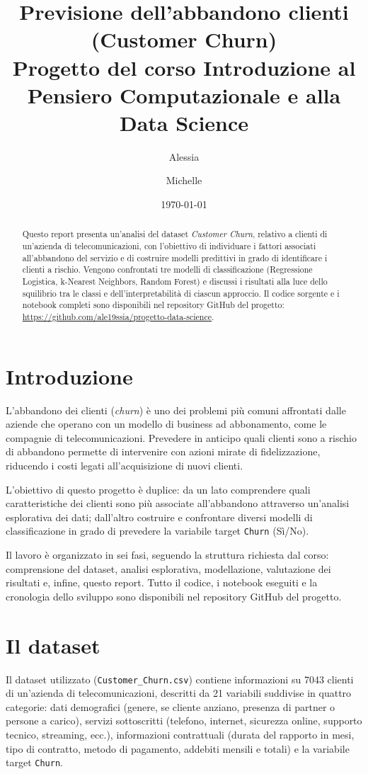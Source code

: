 \documentclass[11pt,a4paper]{article}
\title{Previsione dell'abbandono clienti (Customer Churn)\\
\large Progetto del corso Introduzione al Pensiero Computazionale e alla Data Science}
\author{Alessia \and Michelle}
\date{\today}
\begin{document}
\maketitle

\begin{abstract}
Questo report presenta un'analisi del dataset \emph{Customer Churn}, relativo a clienti di un'azienda di telecomunicazioni, con l'obiettivo di individuare i fattori associati all'abbandono del servizio e di costruire modelli predittivi in grado di identificare i clienti a rischio. Vengono confrontati tre modelli di classificazione (Regressione Logistica, k-Nearest Neighbors, Random Forest) e discussi i risultati alla luce dello squilibrio tra le classi e dell'interpretabilità di ciascun approccio. Il codice sorgente e i notebook completi sono disponibili nel repository GitHub del progetto: \url{https://github.com/ale19ssia/progetto-data-science}.
\end{abstract}

\section{Introduzione}

L'abbandono dei clienti (\emph{churn}) è uno dei problemi più comuni affrontati dalle aziende che operano con un modello di business ad abbonamento, come le compagnie di telecomunicazioni. Prevedere in anticipo quali clienti sono a rischio di abbandono permette di intervenire con azioni mirate di fidelizzazione, riducendo i costi legati all'acquisizione di nuovi clienti.

L'obiettivo di questo progetto è duplice: da un lato comprendere quali caratteristiche dei clienti sono più associate all'abbandono attraverso un'analisi esplorativa dei dati; dall'altro costruire e confrontare diversi modelli di classificazione in grado di prevedere la variabile target \texttt{Churn} (Sì/No).

Il lavoro è organizzato in sei fasi, seguendo la struttura richiesta dal corso: comprensione del dataset, analisi esplorativa, modellazione, valutazione dei risultati e, infine, questo report. Tutto il codice, i notebook eseguiti e la cronologia dello sviluppo sono disponibili nel repository GitHub del progetto.

\section{Il dataset}

Il dataset utilizzato (\texttt{Customer\_Churn.csv}) contiene informazioni su 7043 clienti di un'azienda di telecomunicazioni, descritti da 21 variabili suddivise in quattro categorie: dati demografici (genere, se cliente anziano, presenza di partner o persone a carico), servizi sottoscritti (telefono, internet, sicurezza online, supporto tecnico, streaming, ecc.), informazioni contrattuali (durata del rapporto in mesi, tipo di contratto, metodo di pagamento, addebiti mensili e totali) e la variabile target \texttt{Churn}.
\end{document}
